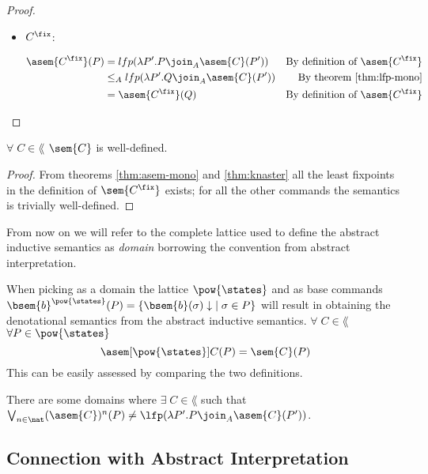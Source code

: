 \begin{proof}
\begin{itemize}
    \item $C^\fix$:

      \begin{align*}
        \asem{C^\fix}(P) 
          &= lfp(\lambda P'. P \join_A \asem{C}(P'))
          &\text{By definition of $\asem{C^\fix}$}\\
          &\leq_A lfp(\lambda P'. Q \join_A \asem{C}(P'))
          &\text{By theorem \ref{thm:lfp-mono}}\\
          &= \asem{C^\fix}(Q) 
          &\text{By definition of $\asem{C^\fix}$}\\
      \end{align*}

  \end{itemize}

\end{proof}


\begin{lemma}
  $\forall \; C \in \lang$ $\sem{C}$ is well-defined.
\end{lemma}
\begin{proof}
  From theorems \ref{thm:asem-mono} and 
  \ref{thm:knaster} all the least fixpoints in the definition of 
  $\sem{C^\fix}$ exists; for all the other commands the semantics is 
  trivially well-defined.
\end{proof}

From now on we will refer to the complete lattice used to define the abstract
inductive semantics as \textit{domain} borrowing the convention from abstract
interpretation.

\begin{observation}
  \label{obs:post}
  When picking as a domain the lattice $\pow{\states}$ and as base commands
  $\bsem{b}^{\pow{\states}}(P) = \{ \bsem{b}(\sigma)\downarrow \; \mid \sigma 
  \in P \}$ will result in obtaining the denotational semantics from the 
  abstract inductive semantics. $\forall \; C \in \lang$ $\forall P \in 
  \pow{\states}$ 
  $$\asem[\pow{\states}]{C}(P) = \sem{C}(P)$$
  This can be easily assessed by comparing the two definitions.
\end{observation}

\begin{observation}
  \label{obs:abstract-fix}
  There are some domains where $\exists \; C \in \lang$ such that
  $\bigvee_{n \in \nat} (\asem{C})^n(P) \neq \lfp(\lambda P'. P \join_A
  \asem{C}(P'))$.
\end{observation}

\subsection{Connection with Abstract Interpretation}

